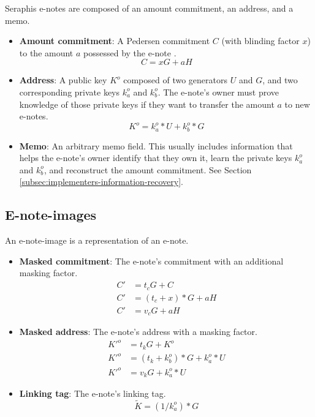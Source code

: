 Seraphis e-notes are composed of an amount commitment, an address, and a memo.

\begin{itemize}
    \item \textbf{Amount commitment}: A Pedersen commitment $C$ (with blinding factor $x$) to the amount $a$ possessed by the e-note \cite{Pedersen1992, maxwell-ct-2}.
    \[C = x G + a H\]

    \item \textbf{Address}: A public key $K^o$ composed of two generators $U$ and $G$, and two corresponding private keys $k^o_a$ and $k^o_b$. The e-note's owner must prove knowledge of those private keys if they want to transfer the amount $a$ to new e-notes.\vspace{.115cm}
    \[K^o = k^o_a*U + k^o_b*G\]

    \item \textbf{Memo}: An arbitrary memo field. This usually includes information that helps the e-note's owner identify that they own it, learn the private keys $k^o_a$ and $k^o_b$, and reconstruct the amount commitment. See Section \ref{subsec:implementers-information-recovery}.
\end{itemize}


\subsection{E-note-images}
\label{subsec:seraphis-e-note-images}

An e-note-image is a representation of an e-note.

\begin{itemize}
    \item \textbf{Masked commitment}: The e-note's commitment with an additional masking factor.\vspace{.115cm}
    \begin{align*}
        C' &= t_c G + C \\
        C' &= (t_c + x)*G + a H \\
        C' &= v_c G + a H
    \end{align*}

    \item \textbf{Masked address}: The e-note's address with a masking factor.\vspace{.115cm}
    \begin{align*}
        K'^o &= t_k G + K^o \\
        K'^o &= (t_k + k^o_b)*G + k^o_a*U \\
        K'^o &= v_k G + k^o_a*U
    \end{align*}

    \item \textbf{Linking tag}: The e-note's linking tag.\vspace{.115cm}
    \[\tilde{K} = (1/k^o_a)*G\]
\end{itemize}

